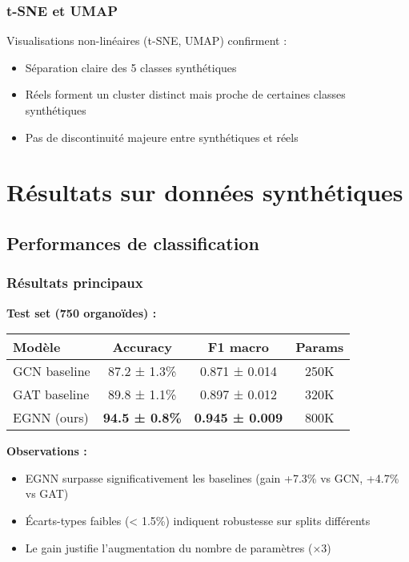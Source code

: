 \subsubsection{t-SNE et UMAP}

Visualisations non-linéaires (t-SNE, UMAP) confirment :
\begin{itemize}
    \item Séparation claire des 5 classes synthétiques
    \item Réels forment un cluster distinct mais proche de certaines classes synthétiques
    \item Pas de discontinuité majeure entre synthétiques et réels
\end{itemize}

\section{Résultats sur données synthétiques}

\subsection{Performances de classification}

\subsubsection{Résultats principaux}

\textbf{Test set (750 organoïdes) :}

\begin{center}
\begin{tabular}{|l|c|c|c|}
\hline
\textbf{Modèle} & \textbf{Accuracy} & \textbf{F1 macro} & \textbf{Params} \\
\hline
GCN baseline & 87.2 ± 1.3\% & 0.871 ± 0.014 & 250K \\
GAT baseline & 89.8 ± 1.1\% & 0.897 ± 0.012 & 320K \\
EGNN (ours) & \textbf{94.5 ± 0.8\%} & \textbf{0.945 ± 0.009} & 800K \\
\hline
\end{tabular}
\end{center}

\textbf{Observations :}
\begin{itemize}
    \item EGNN surpasse significativement les baselines (gain +7.3\% vs GCN, +4.7\% vs GAT)
    \item Écarts-types faibles (< 1.5\%) indiquent robustesse sur splits différents
    \item Le gain justifie l'augmentation du nombre de paramètres (×3)
\end{itemize}

